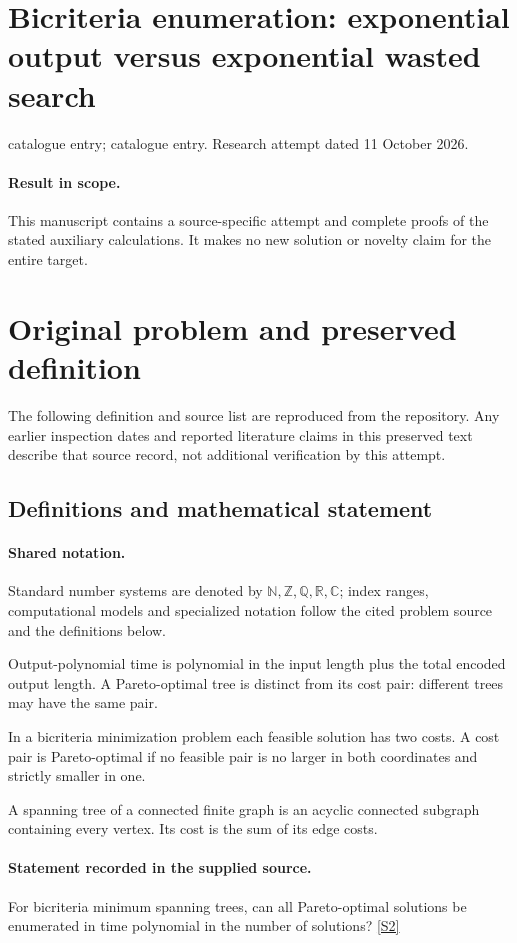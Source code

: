 \documentclass[11pt]{article}
\begin{document}
\section*{Bicriteria enumeration: exponential output versus exponential wasted search}
\noindent catalogue entry; catalogue entry. Research attempt dated 11 October 2026.
\paragraph{Result in scope.}This manuscript contains a source-specific attempt and complete proofs of the stated auxiliary calculations. It makes no new solution or novelty claim for the entire target.
\section{Original problem and preserved definition}
The following definition and source list are reproduced from the repository. Any earlier inspection dates and reported literature claims in this preserved text describe that source record, not additional verification by this attempt.
\subsection{Definitions and mathematical statement}

\paragraph{Shared notation.}Standard number systems are denoted by $\mathbb N,\mathbb Z,\mathbb Q,\mathbb R,\mathbb C$; index ranges, computational models and specialized notation follow the cited problem source and the definitions below.


Output-polynomial time is polynomial in the input length plus the total encoded output length. A Pareto-optimal tree is distinct from its cost pair: different trees may have the same pair.

In a bicriteria minimization problem each feasible solution has two costs. A cost pair is Pareto-optimal if no feasible pair is no larger in both coordinates and strictly smaller in one.

A spanning tree of a connected finite graph is an acyclic connected subgraph containing every vertex. Its cost is the sum of its edge costs.
\paragraph{Statement recorded in the supplied source.}
For bicriteria minimum spanning trees, can all Pareto-optimal solutions be enumerated in time polynomial in the number of solutions? \href{https://doi.org/10.4171/owr/2004/28}{[S2]}
\end{document}

